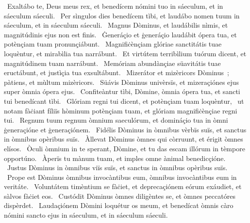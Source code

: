 ~Exaltábo te, Deus meus rex, et benedícem nómini tuo in sáeculum, et in sáeculum sáeculi. 
~Per sìngulos dies benedícem tìbi, et laudábo nomen tuum in sáeculum, et in sáeculum sáeculi. 
~Magnus Dòminus, et laudábilis nìmis, et magnitúdinis ejus non est finis. 
~Ġeneráçio et ġeneráçio laudábit ópera tua, et potènçiam tuam pronunçiábunt. 
~Magnifiċènçiam glóriae sanctitátis tuae loquèntur, et mirabìlia tua narrábunt. 
~Et virtútem terribìlium tuórum dicent, et magnitúdinem tuam narrábunt. 
~Memóriam abundànçiae süavitátis tuae eructábunt, et justìçia tua exsultábunt. 
~Mizerátor et mizèricors Dòminus~; pàtiens, et mùltum mizèricors. 
~Süávis Dòminus univèrsïs, et mizeraçiónes ejus super òmnia ópera ejus. 
~Confiteàntur tìbi, Dòmine, òmnia ópera tua, et sancti tui benedícant tìbi. 
~Glóriam regni tui dicent, et potènçiam tuam loquèntur, 
~ut notam fàċiant fíliïs hòminum potènçiam tuam, et glóriam magnifiċènçiae regni tui. 
~Regnum tuum regnum òmnium saeculórum, et domináçio tua in òmni ġeneraçióne et ġeneraçiónem. 
~Fidélis Dòminus in òmnibus vèrbïs suïs, et sanctus in òmnibus opèribus suïs. 
~Àllevat Dòminus òmnes qui còrruunt, et érigit òmnes elísos. 
~Òculi òmnium in te sperant, Dòmine, et tu das escam illórum in tèmpore opportúno. 
~Àperïs tu mànum tuam, et imples omne ànimal benedicçióne. 
~Justus Dòminus in òmnibus viïs suïs, et sanctus in òmnibus opèribus suïs. 
~Prope est Dòminus òmnibus invocàntibus eum, òmnibus invocàntibus eum in veritáte. 
~Voluntátem timèntium se fàċiet, et deprecaçiónem eórum exáudiet, et sàlvos fàċiet eos. 
~Custódit Dòminus òmnes diligèntes se, et òmnes peccatóres dispèrdet. 
~Laudaçiónem Dòmini loquétur os meum, et benedícat òmnis càro nómini sancto ejus in sáeculum, et in sáeculum sáeculi. 
